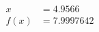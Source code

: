 \documentclass[preview]{standalone}
\begin{document}
\begin{align*}
x &= 4.9566\\f(x) &= 7.9997642
\end{align*}
\end{document}
